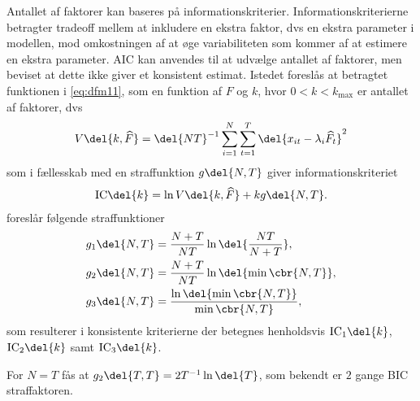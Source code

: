Antallet af faktorer kan baseres på informationskriterier.
Informationskriterierne betragter tradeoff mellem at inkludere en ekstra faktor, dvs en ekstra parameter i modellen, mod omkostningen af at øge variabiliteten som kommer af at estimere en ekstra parameter.
AIC kan anvendes til at udvælge antallet af faktorer, men \citep{Bai_Ng} beviset at dette ikke giver et konsistent estimat.
Istedet foreslås at betragtet funktionen i \eqref{eq:dfm11}, som en funktion af \(F\) og \(k\), hvor \(0<k<k_\text{max}\) er antallet af faktorer, dvs
\begin{align*}
V \del{k, \widehat{F}} = \del{NT}^{-1} \sum_{i=1}^N \sum_{t=1}^T \del{x_{it} -\lambda_i \widehat{F_t}}^2
\end{align*}
som i fællesskab med en straffunktion \(g \del{N,T}\) giver informationskriteriet
\begin{align*}
\text{IC} \del{k} = \ln V \del{k, \widehat{F}} + k g \del{N,T}.
\end{align*}
\citep{Bai_Ng} foreslår følgende straffunktioner
\begin{align*}
g_1 \del{N,T} &= \frac{N + T}{N T} \ln \del{\frac{NT}{N + T}}, \\
g_2 \del{N,T} &= \frac{N + T}{N T} \ln \del{ \min \cbr{N, T}}, \\
g_3 \del{N,T} &= \frac{\ln \del{\min \cbr{N, T}}}{\min \cbr{N, T}},
\end{align*}
som resulterer i konsistente kriterierne der betegnes henholdsvis \(\text{IC}_1 \del{k}\), \(\text{IC}_2 \del{k}\) samt \(\text{IC}_3 \del{k}\).

For \(N = T\) fås at \(g_2 \del{T,T} = 2T^{-1} \ln \del{T}\), som bekendt er \(2\) gange BIC straffaktoren.
%
